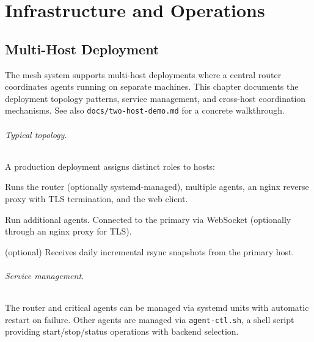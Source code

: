 \documentclass[11pt,letterpaper]{report}
\newcommand{\code}[1]{\texttt{#1}}
\begin{document}
\part{Infrastructure and Operations}
\label{part:infrastructure}

\chapter{Multi-Host Deployment}
\label{ch:deployment}

The mesh system supports multi-host deployments where a central router
coordinates agents running on separate machines. This chapter documents
the deployment topology patterns, service management, and cross-host
coordination mechanisms. See also \code{docs/two-host-demo.md} for a
concrete walkthrough.

\paragraph{Typical topology.}
A production deployment assigns distinct roles to hosts:
\begin{description}[nosep, leftmargin=1.5em]
  \item[Primary host] Runs the router (optionally systemd-managed),
    multiple agents, an nginx reverse proxy with TLS termination, and the
    web client.
  \item[Secondary host(s)] Run additional agents. Connected to the
    primary via WebSocket (optionally through an nginx proxy for TLS).
  \item[Backup target] (optional) Receives daily incremental rsync
    snapshots from the primary host.
\end{description}

\paragraph{Service management.}
The router and critical agents can be managed via systemd units with
automatic restart on failure. Other agents are managed via
\code{agent-ctl.sh}, a shell script providing start/stop/status
operations with backend selection.
\end{document}
